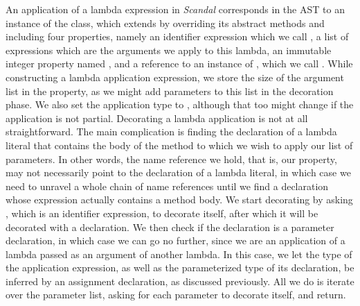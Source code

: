 An application of a lambda expression in \emph{Scandal} corresponds in the AST to an instance of the  class, which extends  by overriding its abstract methods and including four properties, namely an identifier expression which we call , a list of expressions which are the arguments we apply to this lambda, an immutable integer property named , and a reference to an instance of , which we call . While constructing a lambda application expression, we store the size of the argument list in the  property, as we might add parameters to this list in the decoration phase. We also set the application type to , although that too might change if the application is not partial. Decorating a lambda application is not at all straightforward. The main complication is finding the declaration of a lambda literal that contains the body of the method to which we wish to apply our list of parameters. In other words, the name reference we hold, that is, our  property, may not necessarily point to the declaration of a lambda literal, in which case we need to unravel a whole chain of name references until we find a declaration whose expression actually contains a method body. We start decorating by asking , which is an identifier expression, to decorate itself, after which it will be decorated with a declaration. We then check if the declaration is a parameter declaration, in which case we can go no further, since we are an application of a lambda passed as an argument of another lambda. In this case, we let the type of the application expression, as well as the parameterized type of its declaration, be inferred by an assignment declaration, as discussed previously. All we do is iterate over the parameter list, asking for each parameter to decorate itself, and return.

